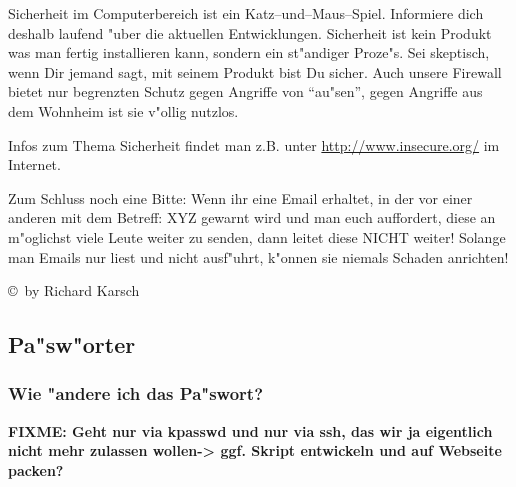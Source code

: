 \documentclass[12pt,titlepage,twoside]{scrartcl}
\newcommand{\glossar}{
\unitlength1.5mm
\begin{picture}(2,2)
\put(0,0){\vector(2,1){2.5}}
\end{picture}
}
\newcommand{\subauthor}[1]{
\begin{flushright}
\footnotesize \copyright\ by #1
\end{flushright}
}
\begin{document}
Sicherheit im Computerbereich ist ein Katz--und--Maus--Spiel. Informiere dich
deshalb laufend "uber die aktuellen Entwicklungen. Sicherheit ist kein Produkt
was man fertig installieren kann, sondern ein st"andiger Proze"s. Sei skeptisch,
wenn Dir jemand sagt, mit seinem Produkt bist Du sicher. Auch unsere Firewall
bietet nur begrenzten Schutz gegen Angriffe von "`au"sen"', gegen Angriffe aus 
dem Wohnheim ist sie v"ollig nutzlos.  

Infos zum Thema Sicherheit findet man z.B. unter \url{http://www.insecure.org/} im Internet.

Zum Schluss noch eine Bitte: Wenn ihr eine Email erhaltet, in der vor einer
anderen mit dem Betreff: XYZ gewarnt wird und man euch auffordert, diese an 
m"oglichst viele Leute weiter zu senden, dann leitet diese NICHT weiter! 
Solange man Emails nur liest und nicht ausf"uhrt, k"onnen sie niemals Schaden
anrichten!

\subauthor{Richard Karsch}

\subsection{Pa"sw"orter}
\label{passwort}

\subsubsection*{Wie "andere ich das Pa"swort?}
\textbf{FIXME: Geht nur via kpasswd und nur via ssh, das wir ja
  eigentlich nicht mehr zulassen wollen-> ggf. Skript entwickeln und
  auf Webseite packen?}



\end{document}
